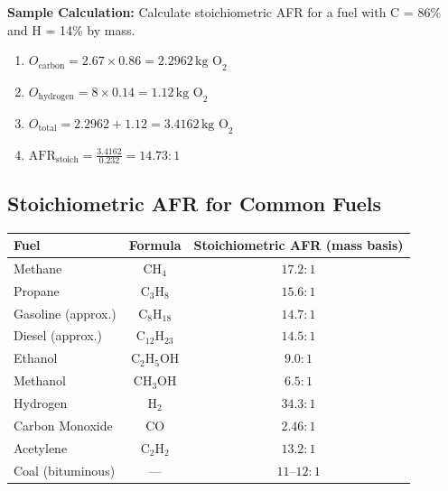 \documentclass[12pt,a4paper]{article}
\begin{document}
\begin{example}
\textbf{Sample Calculation:} Calculate stoichiometric AFR for a fuel with C = 86\% and H = 14\% by mass.
\begin{enumerate}
    \item $O_{\text{carbon}} = 2.67 \times 0.86 = 2.2962\,\text{kg O}_2$
    \item $O_{\text{hydrogen}} = 8 \times 0.14 = 1.12\,\text{kg O}_2$
    \item $O_{\mathrm{total}} = 2.2962 + 1.12 = 3.4162\,\text{kg O}_2$
    \item $\text{AFR}_{\mathrm{stoich}} = \frac{3.4162}{0.232} = 14.73 : 1$
\end{enumerate}
\end{example}

\subsection{Stoichiometric AFR for Common Fuels}
\begin{center}
\renewcommand{\arraystretch}{1.4}
\begin{tabular}{|l|c|c|}
\hline
\textbf{Fuel} & \textbf{Formula} & \textbf{Stoichiometric AFR (mass basis)} \\
\hline
Methane & $\text{CH}_4$ & $17.2 : 1$ \\
Propane & $\text{C}_3\text{H}_8$ & $15.6 : 1$ \\
Gasoline (approx.) & $\text{C}_8\text{H}_{18}$ & $14.7 : 1$ \\
Diesel (approx.) & $\text{C}_{12}\text{H}_{23}$ & $14.5 : 1$ \\
Ethanol & $\text{C}_2\text{H}_5\text{OH}$ & $9.0 : 1$ \\
Methanol & $\text{CH}_3\text{OH}$ & $6.5 : 1$ \\
Hydrogen & $\text{H}_2$ & $34.3 : 1$ \\
Carbon Monoxide & $\text{CO}$ & $2.46 : 1$ \\
Acetylene & $\text{C}_2\text{H}_2$ & $13.2 : 1$ \\
Coal (bituminous) & --- & $11\text{--}12 : 1$ \\
\hline
\end{tabular}
\end{center}
\end{document}
